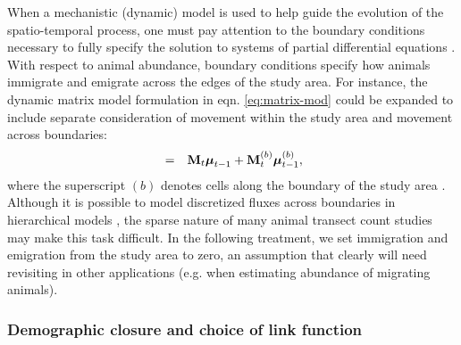 \documentclass[times,mee,doublespace,]{besauth2}
\begin{document}
When a mechanistic (dynamic) model is used to help guide the evolution of the spatio-temporal process, one must pay attention to the boundary conditions necessary to fully specify the solution to systems of partial differential equations \citep[see e.g.][]{Haberman1998}.  With respect to animal abundance, boundary conditions specify how animals immigrate and emigrate across the edges of the study area.  For instance, the dynamic matrix model formulation in eqn. \ref{eq:matrix-mod} could be expanded to include separate consideration of movement within the study area and movement across boundaries:
\begin{eqnarray*}
[\boldsymbol{\mu}_t | \boldsymbol{\mu}_{t-1},\boldsymbol{\theta}] & = & {\bf M}_t  \boldsymbol{\mu}_{t-1} + {\bf M}_t^{(b)} \boldsymbol{\mu}_{t-1}^{(b)},
\end{eqnarray*}
where the superscript $(b)$ denotes cells along the boundary of the study area \citep[][Section 6.3.2]{CressieWikle2011}.   Although it is possible to model discretized fluxes across boundaries in hierarchical models \citep[see e.g.][]{WikleEtAl2003b}, the sparse nature of many animal transect count studies may make this task difficult.  In the following treatment, we set immigration and emigration from the study area to zero, an assumption that clearly will need revisiting in other applications (e.g. when estimating abundance of migrating animals).  

\subsubsection{Demographic closure and choice of link function}
\end{document}
